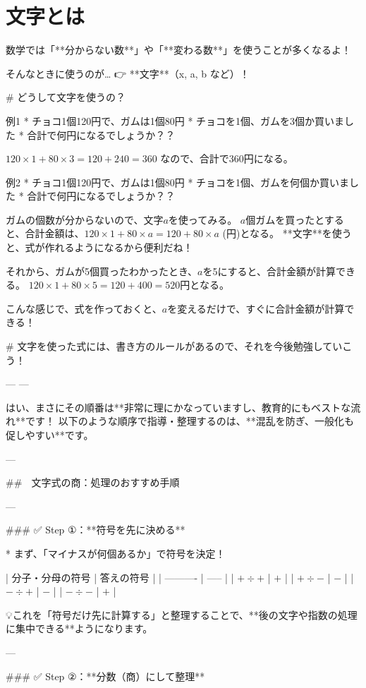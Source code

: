 \documentclass{jsarticle}
\begin{document}

\section*{文字とは}
数学では「**分からない数**」や「**変わる数**」を使うことが多くなるよ！

そんなときに使うのが…
👉 **文字**（x, a, b など）！


# どうして文字を使うの？

例1
* チョコ1個120円で、ガムは1個80円
* チョコを1個、ガムを3個か買いました
* 合計で何円になるでしょうか？？

$120 \times 1 + 80 \times 3 = 120 + 240 =360$
なので、合計で360円になる。

例2
* チョコ1個120円で、ガムは1個80円
* チョコを1個、ガムを何個か買いました
* 合計で何円になるでしょうか？？

ガムの個数が分からないので、文字$a$を使ってみる。
$a$個ガムを買ったとすると、合計金額は、$120 \times 1 + 80 \times a =120 + 80 \times a$ (円)となる。
**文字**を使うと、式が作れるようになるから便利だね！

それから、ガムが5個買ったわかったとき、$a$を5にすると、合計金額が計算できる。
$120 \times 1 + 80 \times 5 =120 + 400 = 520$円となる。

こんな感じで、式を作っておくと、$a$を変えるだけで、すぐに合計金額が計算できる！


# 文字を使った式には、書き方のルールがあるので、それを今後勉強していこう！

---
---

はい、まさにその順番は**非常に理にかなっていますし、教育的にもベストな流れ**です！
以下のような順序で指導・整理するのは、**混乱を防ぎ、一般化も促しやすい**です。

---

## 🔷 文字式の商：処理のおすすめ手順

---

### ✅ Step ①：**符号を先に決める**

* まず、「マイナスが何個あるか」で符号を決定！

| 分子・分母の符号   | 答えの符号 |
| ---------- | ----- |
| $+ \div +$ | $+$   |
| $+ \div -$ | $-$   |
| $- \div +$ | $-$   |
| $- \div -$ | $+$   |

💡これを「符号だけ先に計算する」と整理することで、**後の文字や指数の処理に集中できる**ようになります。

---

### ✅ Step ②：**分数（商）にして整理**
\end{document}
